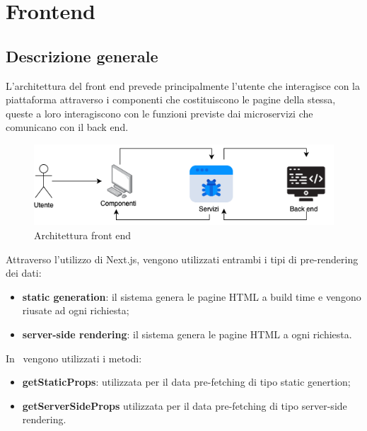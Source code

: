 \newpage
\section{Frontend}\label{Frontend}
\subsection{Descrizione generale}
L'architettura del front end prevede principalmente l'utente che interagisce con la piattaforma attraverso i componenti che costituiscono le pagine della stessa, queste a loro interagiscono con le funzioni previste dai microservizi che comunicano con il back end.
\begin{figure}[H]
	\centering
	\includegraphics[scale=0.6]{Immagini/Frontend/fe.png}
	\caption{Architettura front end}
	\label{fig:fe}
\end{figure}
Attraverso l'utilizzo di Next.js, vengono utilizzati entrambi i tipi di pre-rendering dei dati: 
\begin{itemize}
	\item \textbf{static generation}: il sistema genera le pagine HTML a build time e vengono riusate ad ogni richiesta;
	\item \textbf{server-side rendering}: il sistema genera le pagine HTML a ogni richiesta.
\end{itemize}
In \NomeProgetto\ vengono utilizzati i metodi:
\begin{itemize}
	\item \textbf{getStaticProps}: utilizzata per il data pre-fetching di tipo static genertion;
	\item \textbf{getServerSideProps} utilizzata per il data pre-fetching di tipo server-side rendering.
\end{itemize}
